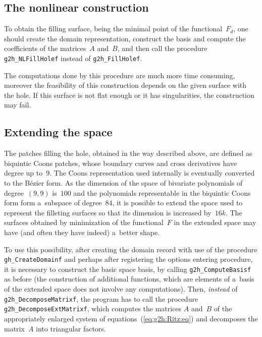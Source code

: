 \subsection{The nonlinear construction}

To obtain the filling surface, being the minimal point of the functional~$F_d$,
one should create the domain representation, construct the basis and compute
the coefficients of the matrices~$A$ and~$B$, and then call the procedure
\texttt{g2h\_NLFillHolef} instead of \texttt{g2h\_FillHolef}.

The computations done by this procedure are much more time consuming,
moreover the feasibility of this construction depends on the given
surface with the hole. If this surface is not flat enough or it has
singularities, the construction may fail.


\subsection{Extending the space}

The patches filling the hole, obtained in the way described above, are
defined as biquintic Coons patches, whose boundary curves and cross derivatives
have degree up to~$9$. The Coons representation used internally is
eventually converted to the B\'{e}zier form. As the dimension of the space
of bivariate polynomials of degree~$(9,9)$ is~$100$ and the polynomials
representable in the biquintic Coons form form a~subspace of degree~$84$,
it is possible to extend the space used to represent the filleting surfaces
so that its dimension is increased by~$16k$. The surfaces obtained by
minimization of the functional~$F$ in the extended space may have
(and often they have indeed) a~better shape.

\begin{sloppypar}
To use this possibility, after creating the domain record with use of the
procedure \texttt{gh\_CreateDomainf} and perhaps after registering
the options entering procedure, it is necessary to construct the
basic space basis, by calling \texttt{g2h\_ComputeBasisf} as before
(the construction of additional functions, which are elements of a~basis
of the extended space does not involve any computations). Then,
\emph{instead} of \texttt{g2h\_DecomposeMatrixf}, the program has to call
the procedure \texttt{g2h\_DecomposeExtMatrixf}, which computes the matrices
$A$ and~$B$ of the appropriately enlarged system of
equations~(\ref{eq:g2h:Ritz:eq}) and decomposes the matrix~$A$ into
triangular factors.%
\end{sloppypar}

